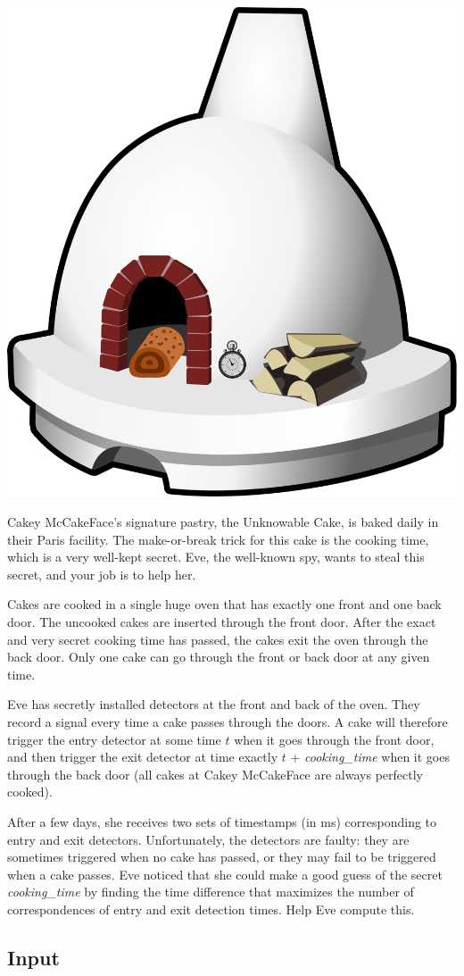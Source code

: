 
\begin{center}
\includegraphics[width=.4\linewidth]{oven}
\end{center}

\noindent
Cakey McCakeFace's signature pastry, the Unknowable Cake, is baked
daily in their Paris facility. The make-or-break trick for this cake
is the cooking time, which is a very well-kept secret. Eve, the
well-known spy, wants to steal this secret, and your job is to
help her.

Cakes are cooked in a single huge oven that has exactly one front
and one back door. The uncooked cakes are inserted through the front
door. After the exact and very secret cooking time has passed, the
cakes exit the oven through the back door.
Only one cake can go through the front or back door at any given time. 

Eve has secretly installed detectors at the front and back of the oven. They
record a signal every time a cake passes through the doors. A cake
will therefore trigger the entry detector at some time $t$ when it goes
through the front door, and then
trigger the exit detector at time exactly $t$ + \emph{cooking\_time} when
it goes through the back door
(all cakes at Cakey McCakeFace are always perfectly cooked).

After a few days, she receives two sets of timestamps (in ms)
corresponding to entry and exit detectors. Unfortunately, the
detectors are faulty: they are sometimes triggered when no cake has passed, or
they may fail to be triggered when a cake passes. Eve noticed that she could make a good guess of the
secret \emph{cooking\_time} by finding the time difference that
maximizes the number of correspondences of entry and exit
detection times. Help Eve compute this.

\subsection*{Input}

